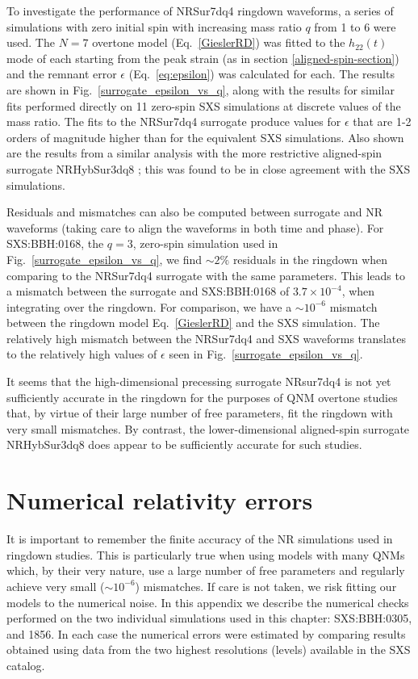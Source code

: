 To investigate the performance of NRSur7dq4 ringdown waveforms, a series of simulations with zero initial spin with increasing mass ratio $q$ from 1 to 6 were used. 
The $N=7$ overtone model (Eq.~\ref{GieslerRD}) was fitted to the $h_{22}(t)$ mode of each starting from the peak strain (as in section \ref{aligned-spin-section})
and the remnant error $\epsilon$ (Eq.~\ref{eq:epsilon}) was calculated for each.
The results are shown in Fig.~\ref{surrogate_epsilon_vs_q}, along with the results for similar fits performed directly on 11 zero-spin SXS simulations at discrete values of the mass ratio. 
The fits to the NRSur7dq4 surrogate produce values for $\epsilon$ that are 1-2 orders of magnitude higher than for the equivalent SXS simulations. 
Also shown are the results from a similar analysis with the more restrictive aligned-spin surrogate NRHybSur3dq8 \cite{Varma:2018mmi}; this was found to be in close agreement with the SXS simulations.

Residuals and mismatches can also be computed between surrogate and NR waveforms (taking care to align the waveforms in both time and phase).
For SXS:BBH:0168, the $q=3$, zero-spin simulation used in Fig.~\ref{surrogate_epsilon_vs_q}, we find $\sim 2\%$ residuals in the ringdown when comparing to the NRSur7dq4 surrogate with the same parameters. 
This leads to a mismatch between the surrogate and SXS:BBH:0168 of $3.7 \times 10^{-4}$, when integrating over the ringdown. For comparison, we have a $\sim 10^{-6}$ mismatch between the ringdown model Eq.~\eqref{GieslerRD} and the SXS simulation. The relatively high mismatch between the NRSur7dq4 and SXS waveforms translates to the relatively high values of $\epsilon$ seen in Fig.~\ref{surrogate_epsilon_vs_q}. 

It seems that the high-dimensional precessing surrogate NRsur7dq4 is not yet sufficiently accurate in the ringdown for the purposes of QNM overtone studies that, by virtue of their large number of free parameters, fit the ringdown with very small mismatches. 
By contrast, the lower-dimensional aligned-spin surrogate NRHybSur3dq8 does appear to be sufficiently accurate for such studies.


\section{Numerical relativity errors}\label{NR_error_appendix}

It is important to remember the finite accuracy of the NR simulations used in ringdown studies.
This is particularly true when using models with many QNMs which, by their very nature, use a large number of free parameters and regularly achieve very small ($\sim 10^{-6}$) mismatches.
If care is not taken, we risk fitting our models to the numerical noise. 
In this appendix we describe the numerical checks performed on the two individual simulations used in this chapter: SXS:BBH:0305, and 1856. %
In each case the numerical errors were estimated by comparing results obtained using data from the two highest resolutions (levels) available in the SXS catalog. 

